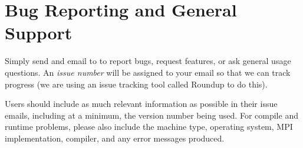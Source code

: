 
\section{Bug Reporting and General Support}

Simply send and email to  to report bugs, request
features, or ask general usage questions.  An {\em issue number} will be
assigned to your email so that we can track progress (we are using an issue
tracking tool called Roundup to do this).

Users should include as much relevant information as possible in their issue
emails, including at a minimum, the \hypre{} version number being used.  For
compile and runtime problems, please also include the machine type, operating
system, MPI implementation, compiler, and any error messages produced.


